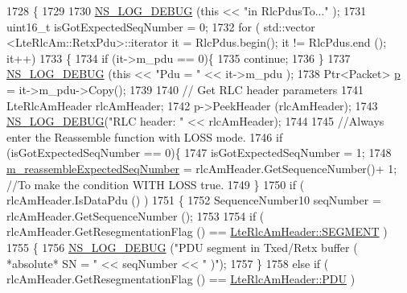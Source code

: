 \begin{DoxyCode}
1728                                                                 \{
1729 
1730   \hyperlink{group__logging_ga413f1886406d49f59a6a0a89b77b4d0a}{NS\_LOG\_DEBUG} (\textcolor{keyword}{this} << \textcolor{stringliteral}{"in RlcPdusTo..."} );
1731   uint16\_t isGotExpectedSeqNumber = 0;
1732   \textcolor{keywordflow}{for} ( std::vector <LteRlcAm::RetxPdu>::iterator it = RlcPdus.begin(); it != RlcPdus.end (); it++)
1733         \{
1734           \textcolor{keywordflow}{if} (it->m\_pdu == 0)\{
1735             \textcolor{keywordflow}{continue};
1736           \}
1737           \hyperlink{group__logging_ga413f1886406d49f59a6a0a89b77b4d0a}{NS\_LOG\_DEBUG} (\textcolor{keyword}{this} << \textcolor{stringliteral}{"Pdu = "} << it->m\_pdu );
1738           Ptr<Packet> \hyperlink{lte__link__budget_8m_ac9de518908a968428863f829398a4e62}{p} = it->m\_pdu->Copy();
1739 
1740           \textcolor{comment}{// Get RLC header parameters}
1741           LteRlcAmHeader rlcAmHeader;
1742           p->PeekHeader (rlcAmHeader);
1743           \hyperlink{group__logging_ga413f1886406d49f59a6a0a89b77b4d0a}{NS\_LOG\_DEBUG}(\textcolor{stringliteral}{"RLC header: "} << rlcAmHeader);
1744           
1745           \textcolor{comment}{//Always enter the Reassemble function with LOSS mode.}
1746           \textcolor{keywordflow}{if} (isGotExpectedSeqNumber  == 0)\{ 
1747               isGotExpectedSeqNumber = 1;
1748               \hyperlink{classns3_1_1LteRlcAm_a98a0e0d29fe1254e55ac9b029d7b9934}{m\_reassembleExpectedSeqNumber} = rlcAmHeader.GetSequenceNumber()+
      1; \textcolor{comment}{//To make the condition WITH LOSS true.}
1749           \}
1750           \textcolor{keywordflow}{if} ( rlcAmHeader.IsDataPdu () )
1751             \{
1752               SequenceNumber10 seqNumber = rlcAmHeader.GetSequenceNumber ();
1753 
1754               \textcolor{keywordflow}{if} ( rlcAmHeader.GetResegmentationFlag () == 
      \hyperlink{classns3_1_1LteRlcAmHeader_aa7a03eaac5875a18c2f95d3a0091d138a81153e1c386467eae03f6805ba812b83}{LteRlcAmHeader::SEGMENT} )
1755                 \{
1756                   \hyperlink{group__logging_ga413f1886406d49f59a6a0a89b77b4d0a}{NS\_LOG\_DEBUG} (\textcolor{stringliteral}{"PDU segment in Txed/Retx buffer ( *absolute* SN = "} << 
      seqNumber << \textcolor{stringliteral}{" )"});
1757                 \}
1758               \textcolor{keywordflow}{else} \textcolor{keywordflow}{if} ( rlcAmHeader.GetResegmentationFlag () == 
      \hyperlink{classns3_1_1LteRlcAmHeader_aa7a03eaac5875a18c2f95d3a0091d138a6f96f786048a3d5e5189aba4e21f5d22}{LteRlcAmHeader::PDU} )

\end{DoxyCode}
